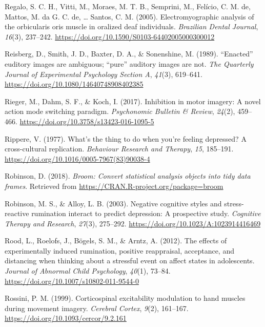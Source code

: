\documentclass[a4paper,12pt,twoside,onecolumn,openright,final,oldfontcommands]{memoir}
\begin{document}
\leavevmode\hypertarget{ref-regalo_electromyographic_2005}{}%
Regalo, S. C. H., Vitti, M., Moraes, M. T. B., Semprini, M., Felício, C. M. de, Mattos, M. da G. C. de, \ldots{} Santos, C. M. (2005). Electromyographic analysis of the orbicularis oris muscle in oralized deaf individuals. \emph{Brazilian Dental Journal}, \emph{16}(3), 237--242. \url{https://doi.org/10.1590/S0103-64402005000300012}

\leavevmode\hypertarget{ref-reisberg_enacted_1989}{}%
Reisberg, D., Smith, J. D., Baxter, D. A., \& Sonenshine, M. (1989). ``Enacted'' euditory images are ambiguous; ``pure'' auditory images are not. \emph{The Quarterly Journal of Experimental Psychology Section A}, \emph{41}(3), 619--641. \url{https://doi.org/10.1080/14640748908402385}

\leavevmode\hypertarget{ref-rieger_inhibition_2017}{}%
Rieger, M., Dahm, S. F., \& Koch, I. (2017). Inhibition in motor imagery: A novel action mode switching paradigm. \emph{Psychonomic Bulletin \& Review}, \emph{24}(2), 459--466. \url{https://doi.org/10.3758/s13423-016-1095-5}

\leavevmode\hypertarget{ref-Rippere1977}{}%
Rippere, V. (1977). What's the thing to do when you're feeling depressed? A cross-cultural replication. \emph{Behaviour Research and Therapy}, \emph{15}, 185--191. \url{https://doi.org/10.1016/0005-7967(83)90038-4}

\leavevmode\hypertarget{ref-R-broom}{}%
Robinson, D. (2018). \emph{Broom: Convert statistical analysis objects into tidy data frames}. Retrieved from \url{https://CRAN.R-project.org/package=broom}

\leavevmode\hypertarget{ref-Robinson2003}{}%
Robinson, M. S., \& Alloy, L. B. (2003). Negative cognitive styles and stress-reactive rumination interact to predict depression: A prospective study. \emph{Cognitive Therapy and Research}, \emph{27}(3), 275--292. \url{https://doi.org/10.1023/A:1023914416469}

\leavevmode\hypertarget{ref-Rood2012}{}%
Rood, L., Roelofs, J., Bögels, S. M., \& Arntz, A. (2012). The effects of experimentally induced rumination, positive reappraisal, acceptance, and distancing when thinking about a stressful event on affect states in adolescents. \emph{Journal of Abnormal Child Psychology}, \emph{40}(1), 73--84. \url{https://doi.org/10.1007/s10802-011-9544-0}

\leavevmode\hypertarget{ref-rossini_corticospinal_1999}{}%
Rossini, P. M. (1999). Corticospinal excitability modulation to hand muscles during movement imagery. \emph{Cerebral Cortex}, \emph{9}(2), 161--167. \url{https://doi.org/10.1093/cercor/9.2.161}
\end{document}
